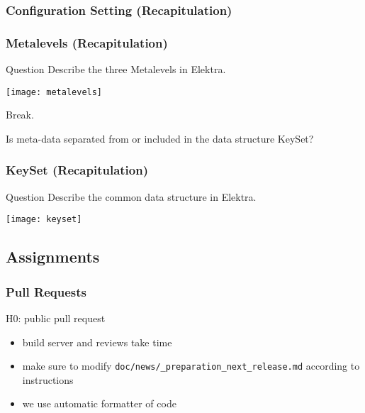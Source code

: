 \begin{frame}
	\frametitle{Configuration Setting (Recapitulation)}

	\pause

	
\end{frame}

\begin{frame}
	\frametitle{Metalevels (Recapitulation)}
	\begin{alertblock}{Question}
	Describe the three Metalevels in Elektra.
	\end{alertblock}

	\pause
	\texttt{[image: metalevels]}
\end{frame}

\begin{assignment}
	\begin{task}
	Break.
	\end{task}
\end{assignment}


\begin{assignment}
	\begin{task}
	Is meta-data separated from or included in the data structure KeySet?
	\end{task}
\end{assignment}


\begin{frame}
	\frametitle{KeySet (Recapitulation)}

	\begin{alertblock}{Question}
	Describe the common data structure in Elektra.
	\end{alertblock}

	\vspace{1cm}
	\pause

	\texttt{[image: keyset]}
\end{frame}

\subsection{Assignments}

\begin{frame}
	\frametitle{Pull Requests}

	\begin{task}
	H0: public pull request
	\end{task}

	\begin{itemize}
	\item build server and reviews take time
	\item make sure to modify \texttt{doc/news/\_preparation\_next\_release.md} according to instructions
	\item we use automatic formatter of code
	\end{itemize}
\end{frame}

